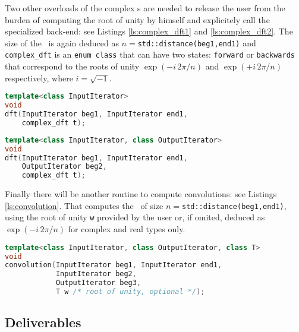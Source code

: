 \noindent Two other overloads of the complex \dft{}s are needed to release the user
from the burden of computing the root of unity by himself and explicitely call
the specialized back-end: see
Listings \ref{ls:complex_dft1} and \ref{ls:complex_dft2}. The size of the \dft\
is again deduced as $n=$\texttt{std::distance(beg1,end1)} and
\texttt{complex\_dft}
is an \texttt{enum class} that can have two states: \texttt{forward} or
\texttt{backwards} that correspond to the roots of unity 
$\exp(-i\, 2\pi/n)$
and 
$\exp(+i\, 2\pi/n)$ respectively,
where $i=\sqrt{-1}$.
\begin{lstlisting}[language=C++,label=ls:complex_dft1,caption=DFT for complex numbers in-place.]
template<class InputIterator> 
void
dft(InputIterator beg1, InputIterator end1, 
    complex_dft t);
\end{lstlisting}

\begin{lstlisting}[language=C++,label=ls:complex_dft2,caption=DFT for complex numbers out-of-place.]
template<class InputIterator, class OutputIterator> 
void
dft(InputIterator beg1, InputIterator end1, 
    OutputIterator beg2, 
    complex_dft t);
\end{lstlisting}

\noindent Finally there will be another routine to compute convolutions: see
Listings \ref{ls:convolution}. That computes the \cdc\ of size
$n=$\texttt{std::distance(beg1,end1)}, using the root of unity \texttt{w} provided by the
user or, if omited, deduced as $\exp(-i\, 2\pi/n)$ for complex and real types only.
\begin{lstlisting}[language=C++,label=ls:convolution,caption=Convolution routine.]
template<class InputIterator, class OutputIterator, class T> 
void
convolution(InputIterator beg1, InputIterator end1, 
            InputIterator beg2,
            OutputIterator beg3, 
            T w /* root of unity, optional */);
\end{lstlisting}

\subsection{Deliverables}

